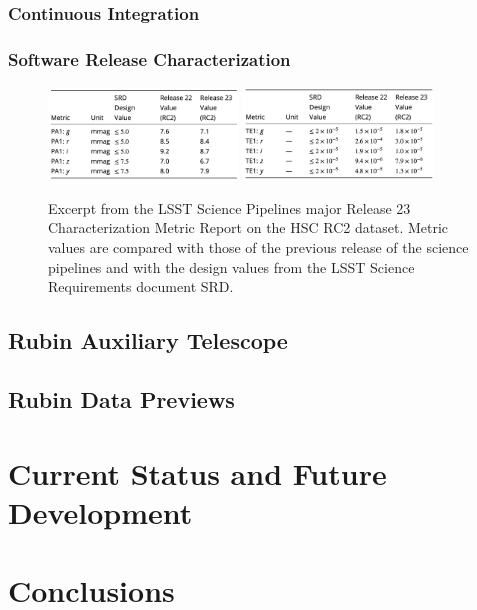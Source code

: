 \subsubsection{Continuous Integration}\label{sssec:ci}

\subsubsection{Software Release Characterization } \label{sssec:characterization}


\begin{figure}[htb]
  \centering
  \includegraphics[width=0.45\textwidth]{figures/cmr_r23_photometric_metrics} 
  \hspace{0.5cm}
  \includegraphics[width=0.45\textwidth]{figures/cmr_r23_ellipticity_metrics}
  \par\medskip %
  \caption{Excerpt from the  LSST Science Pipelines major Release 23 Characterization Metric Report on the HSC RC2 dataset. Metric values are compared with those of the previous release of the science pipelines and with the  design values from the LSST Science Requirements document SRD.}
  \label{fig:cmr_r23}
\end{figure}

\subsection{Rubin Auxiliary Telescope} \label{ssec:auxtel}

\subsection{Rubin Data Previews} \label{ssec:datapreviews}

\section{Current Status and Future Development} \label{sec:future}

\section{Conclusions} \label{sec:conclusions}
